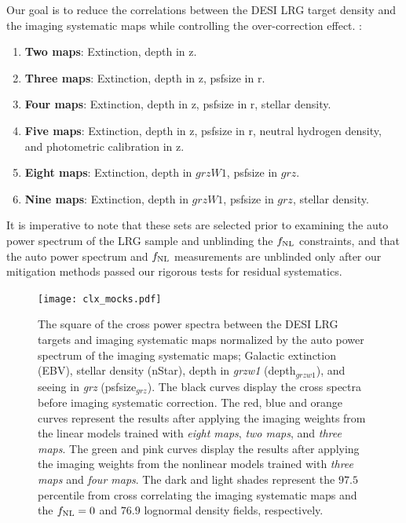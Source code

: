 Our goal is to reduce the correlations between the DESI LRG target density and the imaging systematic maps while controlling the over-correction effect.  :
\begin{enumerate}[itemindent=*]
\item \textbf{Two maps}: Extinction, depth in z.
\item \textbf{Three maps}: Extinction, depth in z, psfsize in r.
\item \textbf{Four maps}: Extinction, depth in z, psfsize in r, stellar density.
\item \textbf{Five maps}: Extinction, depth in z, psfsize in r, neutral hydrogen density, and photometric calibration in z.
\item \textbf{Eight maps}: Extinction, depth in $grzW1$, psfsize in $grz$.
\item \textbf{Nine maps}: Extinction, depth in $grzW1$, psfsize in $grz$, stellar density.
\end{enumerate}

It is imperative to note that these sets are selected prior to examining the auto power spectrum of the LRG sample and unblinding the $f_{\rm NL}$ constraints, and that the auto power spectrum and $f_{\rm NL}$ measurements are unblinded only after our mitigation methods passed our rigorous tests for residual systematics. 



\begin{figure}
\centering
\texttt{[image: clx\_mocks.pdf]}
\caption{The square of the cross power spectra between the DESI LRG targets and imaging systematic maps normalized by the auto power spectrum of the imaging systematic maps;  Galactic extinction (EBV), stellar density (nStar), depth in \textit{grzw1} (depth$_{grzw1}$), and seeing in \textit{grz} (psfsize$_{grz}$). The black curves display the cross spectra before imaging systematic correction. The red, blue and orange curves represent the results after applying the imaging weights from the linear models trained with \textit{eight maps}, \textit{two maps}, and \textit{three maps}. The green and pink curves display the results after applying the imaging weights from the nonlinear models trained with \textit{three maps} and \textit{four maps}. The dark and light shades represent the $97.5$ percentile from cross correlating the imaging systematic maps and the $f_{\rm NL}=0$ and $76.9$ lognormal density fields, respectively.}\label{fig:clxmock}
\end{figure}

